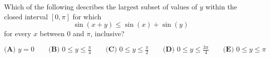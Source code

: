 Which of the following describes the largest subset of values of $y$ within the closed interval $\left[0,\pi\right]$ for which \[\sin\left(x+y\right)\leq\sin\left(x\right)+\sin\left(y\right)\] for every $x$ between $0$ and $\pi$, inclusive?

$\textbf{(A) }y=0\qquad\textbf{(B) }0\leq y\leq\frac{\pi}{4}\qquad\textbf{(C) }0\leq y\leq\frac{\pi}{2}\qquad\textbf{(D) }0\leq y\leq\frac{3\pi}{4}\qquad\textbf{(E) }0\leq y\leq\pi$
